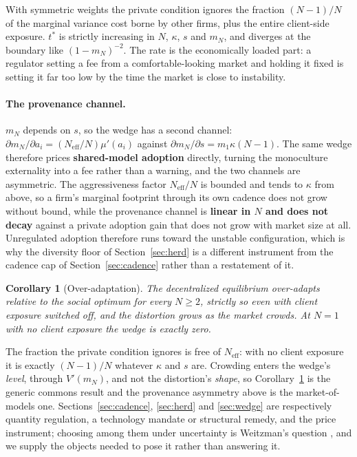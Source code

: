 \documentclass{article}
\theoremstyle{plain}
\newtheorem{corollary}[theorem]{Corollary}
\theoremstyle{definition}
\newcommand{\Neff}{N_{\mathrm{eff}}}
\newcommand{\mN}{m_N}
\begin{document}
With symmetric weights the private condition ignores the fraction $(N-1)/N$ of the marginal variance cost borne by other firms, plus the entire client-side exposure. $t^{*}$ is strictly increasing in $N$, $\kappa$, $s$ and $\mN$, and diverges at the boundary like $(1-\mN)^{-2}$. The rate is the economically loaded part: a regulator setting a fee from a comfortable-looking market and holding it fixed is setting it far too low by the time the market is close to instability.

\paragraph{The provenance channel.}
$\mN$ depends on $s$, so the wedge has a second channel: $\partial\mN/\partial a_i = (\Neff/N)\mu'(a_i)$ against $\partial \mN/\partial s = m_1\kappa(N-1)$. The same wedge therefore prices \textbf{shared-model adoption} directly, turning the monoculture externality into a fee rather than a warning, and the two channels are asymmetric. The aggressiveness factor $\Neff/N$ is bounded and tends to $\kappa$ from above, so a firm's marginal footprint through its own cadence does not grow without bound, while the provenance channel is \textbf{linear in $N$ and does not decay} against a private adoption gain that does not grow with market size at all. Unregulated adoption therefore runs toward the unstable configuration, which is why the diversity floor of Section~\ref{sec:herd} is a different instrument from the cadence cap of Section~\ref{sec:cadence} rather than a restatement of it.

\begin{corollary}[Over-adaptation]
\label{cor:over}
The decentralized equilibrium over-adapts relative to the social optimum for every $N \geq 2$, strictly so even with client exposure switched off, and the distortion grows as the market crowds. At $N=1$ with no client exposure the wedge is exactly zero.
\end{corollary}

The fraction the private condition ignores is free of $\Neff$: with no client exposure it is exactly $(N-1)/N$ whatever $\kappa$ and $s$ are. Crowding enters the wedge's \emph{level}, through $V'(\mN)$, and not the distortion's \emph{shape}, so Corollary~\ref{cor:over} is the generic commons result and the provenance asymmetry above is the market-of-models one. Sections~\ref{sec:cadence}, \ref{sec:herd} and \ref{sec:wedge} are respectively quantity regulation, a technology mandate or structural remedy, and the price instrument; choosing among them under uncertainty is Weitzman's question \citep{weitzman1974}, and we supply the objects needed to pose it rather than answering it.
\end{document}
